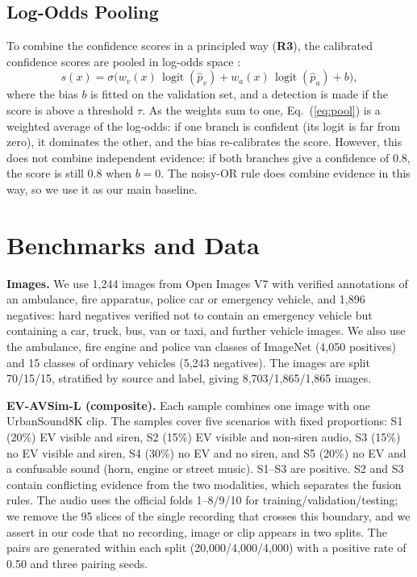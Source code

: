 \documentclass[runningheads,a4paper]{llncs}
\begin{document}
\subsection{Log-Odds Pooling}
\label{sec:pool}

To combine the confidence scores in a principled way (\textbf{R3}), the
calibrated confidence scores are pooled in log-odds space \cite{kittler1998}:
\begin{equation}
s(x) = \sigma\!\Big( w_v(x)\,\operatorname{logit}(\hat p_v)
                   + w_a(x)\,\operatorname{logit}(\hat p_a) + b \Big),
\label{eq:pool}
\end{equation}
where the bias $b$ is fitted on the validation set, and a detection is made if
the score is above a threshold $\tau$. As the weights sum to one,
Eq.~(\ref{eq:pool}) is a weighted average of the log-odds: if one branch is
confident (its logit is far from zero), it dominates the other, and the bias
re-calibrates the score. However, this does not combine independent
evidence: if both branches give a confidence of 0.8, the score is still 0.8
when $b=0$. The noisy-OR rule does combine evidence in this way, so we use it
as our main baseline.

\section{Benchmarks and Data}
\label{sec:pairing}

\textbf{Images.} We use 1,244 images from Open Images V7
\cite{kuznetsova2020} with verified annotations of an ambulance, fire
apparatus, police car or emergency vehicle, and 1,896 negatives: hard
negatives verified not to contain an emergency vehicle but containing a car,
truck, bus, van or taxi, and further vehicle images. We also use the
ambulance, fire engine and police van classes of ImageNet
\cite{russakovsky2015} (4,050 positives) and 15 classes of ordinary vehicles
(5,243 negatives). The images are split 70/15/15, stratified by source and
label, giving 8,703/1,865/1,865 images.

\textbf{EV-AVSim-L (composite).} Each sample combines one image with one
UrbanSound8K clip. The samples cover five scenarios with fixed proportions:
S1 (20\%) EV visible and siren, S2 (15\%) EV visible and non-siren audio, S3
(15\%) no EV visible and siren, S4 (30\%) no EV and no siren, and S5 (20\%)
no EV and a confusable sound (horn, engine or street music). S1--S3 are
positive. S2 and S3 contain conflicting evidence from the two modalities,
which separates the fusion rules. The audio uses the official folds 1--8/9/10
for training/validation/testing; we remove the 95 slices of the single
recording that crosses this boundary, and we assert in our code that no
recording, image or clip appears in two splits. The pairs are generated within
each split (20,000/4,000/4,000) with a positive rate of 0.50 and three pairing
seeds.
\end{document}
